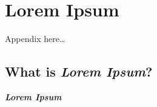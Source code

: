 \chapter{Lorem Ipsum}\label{ch:lorem}

Appendix here\ldots

\section{What is \emph{Lorem Ipsum}?}

\emph{\textbf{Lorem Ipsum}} \lipsum[40]